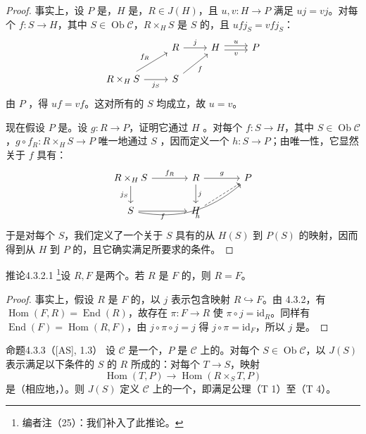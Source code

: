 \begin{proof}
事实上，设 $P$ 是，$H$ 是，$R\in J(H)$，且 $u,v:H\to P$ 满足 $uj=vj$。对每个 $f:S\to H$，其中 $S\in\operatorname{Ob}\mathcal C$，$R\times_H S$ 是 $S$ 的，且 $ufj_S=vfj_S$：
\[
\begin{tikzcd}
&R\arrow[r,"j"]&H\arrow[r,shift left=.5ex,"u"]\arrow[r,shift right=.5ex,"v"']&P\\
R\times_H S\arrow[ur,"f_R"]\arrow[r,"j_S"']&S\arrow[ur,"f"']&&
\end{tikzcd}
\]
由 $P$ ，得 $uf=vf$。这对所有的 $S$ 均成立，故 $u=v$。

现在假设 $P$ 是。设 $g:R\to P$，证明它通过 $H$ 。对每个 $f:S\to H$，其中 $S\in\operatorname{Ob}\mathcal C$，$g\circ f_R:R\times_H S\to P$ 唯一地通过 $S$ ，因而定义一个 $h:S\to P$；由唯一性，它显然关于 $f$ 具有：
\[
\begin{tikzcd}[column sep=large]
R\times_H S\arrow[r,"f_R"]\arrow[d,"j_S"']&R\arrow[r,"g"]\arrow[d,"j"]&P\\
S\arrow[r,"f"']\arrow[urr,bend right=25,"h"']&H\arrow[ur,dashed]&
\end{tikzcd}
\]
于是对每个 $S$，我们定义了一个关于 $S$ 具有的从 $H(S)$ 到 $P(S)$ 的映射，因而得到从 $H$ 到 $P$ 的，且它确实满足所要求的条件。
\end{proof}
\begin{SGAresult}{推论}{4.3.2.1}
\footnote{编者注（25）：我们补入了此推论。}设 $R,F$ 是两个。若 $R$ 是 $F$ 的，则 $R=F$。
\end{SGAresult}
\begin{proof}
事实上，假设 $R$ 是 $F$ 的，以 $j$ 表示包含映射 $R\hookrightarrow F$。由 4.3.2，有 $\operatorname{Hom}(F,R)=\operatorname{End}(R)$，故存在 $\pi:F\to R$ 使 $\pi\circ j=\mathrm{id}_R$。同样有 $\operatorname{End}(F)=\operatorname{Hom}(R,F)$，由 $j\circ\pi\circ j=j$ 得 $j\circ\pi=\mathrm{id}_F$，所以 $j$ 是。
\end{proof}
\begin{SGAresult}{命题}{4.3.3（[AS], 1.3）}
设 $\mathcal C$ 是一个，$P$ 是 $\mathcal C$ 上的。对每个 $S\in\operatorname{Ob}\mathcal C$，以 $J(S)$ 表示满足以下条件的 $S$ 的 $R$ 所成的：对每个 $T\to S$，映射
\[
\operatorname{Hom}(T,P)\longrightarrow\operatorname{Hom}(R\times_S T,P)\tag{+}
\]
是（相应地，）。则 $J(S)$ 定义 $\mathcal C$ 上的一个，即满足公理（T 1）至（T 4）。
\end{SGAresult}
